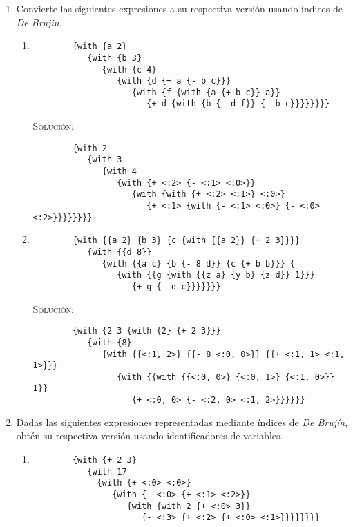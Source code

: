 \documentclass[letterpaper,11pt]{article}
\begin{document}
\begin{enumerate}
\begin{enumerate}
    \end{enumerate}

    \item Convierte las siguientes expresiones a su respectiva versión usando
    índices de \textit{De Brujin}.
    \begin{enumerate}
        \item 
        \begin{verbatim}
        {with {a 2} 
           {with {b 3} 
              {with {c 4} 
                 {with {d {+ a {- b c}}} 
                    {with {f {with {a {+ b c}} a}} 
                       {+ d {with {b {- d f}} {- b c}}}}}}}}
        \end{verbatim}

        \textsc{Solución:}
        \begin{verbatim}
        {with 2 
           {with 3 
              {with 4
                 {with {+ <:2> {- <:1> <:0>}} 
                    {with {with {+ <:2> <:1>} <:0>} 
                       {+ <:1> {with {- <:1> <:0>} {- <:0> <:2>}}}}}}}}
        \end{verbatim}

        \item 
        \begin{verbatim}
        {with {{a 2} {b 3} {c {with {{a 2}} {+ 2 3}}}} 
           {with {{d 8}} 
              {with {{a c} {b {- 8 d}} {c {+ b b}}} {
                 {with {{g {with {{z a} {y b} {z d}} 1}}} 
                    {+ g {- d c}}}}}}}
        \end{verbatim}

        \textsc{Solución:}
        \begin{verbatim}
        {with {2 3 {with {2} {+ 2 3}}} 
           {with {8} 
              {with {{<:1, 2>} {{- 8 <:0, 0>}} {{+ <:1, 1> <:1, 1>}}} 
                 {with {{with {{<:0, 0>} {<:0, 1>} {<:1, 0>}} 1}} 
                    {+ <:0, 0> {- <:2, 0> <:1, 2>}}}}}}
        \end{verbatim}
    \end{enumerate}

    \item Dadas las siguientes expresiones representadas mediante índices de 
    \textit{De Brujín}, obtén su respectiva versión usando identificadores de 
    variables.
    \begin{enumerate}
        \item 
        \begin{verbatim}
        {with {+ 2 3} 
           {with 17 
             {with {+ <:0> <:0>} 
                {with {- <:0> {+ <:1> <:2>}} 
                   {with {with 2 {+ <:0> 3}} 
                      {- <:3> {+ <:2> {+ <:0> <:1>}}}}}}}}
        \end{verbatim}


\end{enumerate}
\end{enumerate}
\end{document}
